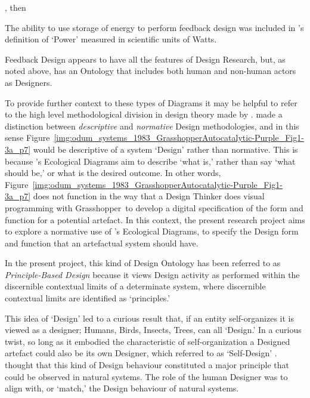 \documentclass[a4paper,12pt]{article}
\begin{document}
,  then 


\citet[p.~15]{odum_systems_1983}



The ability to use storage of energy to perform feedback design was included in \citeauthor{odum_systems_1983}'s definition of `Power' measured in scientific units of Watts. 

Feedback Design appears to have all the features of Design Research, but, as noted above, has an Ontology that includes both human and non-human actors as Designers. 

To provide further context to these types of Diagrams it may be helpful to refer to the high level methodological division in design theory made by \citet{behdad_synergy_2013}. \citeauthor{behdad_synergy_2013} made a  distinction between \textit{descriptive} and \textit{normative} Design methodologies, and in this sense Figure~\ref{img:odum_systems_1983_GrasshopperAutocatalytic-Purple_Fig1-3a_p7} would be descriptive of a system `Design' rather than normative. This is because \citeauthor{odum_systems_1983}'s Ecological Diagrams aim to describe `what is,' rather than say `what should be,' or what is the desired outcome. In other words, Figure~\ref{img:odum_systems_1983_GrasshopperAutocatalytic-Purple_Fig1-3a_p7} does not function in the way that a Design Thinker does visual programming with Grasshopper\texttrademark\ to develop a digital specification of the form and function for a potential artefact. In this context, the present research project aims to explore a normative use of \citeauthor{odum_systems_1983}'s Ecological Diagrams, to specify the Design form and function that an artefactual system should have. 


In the present project, this kind of Design Ontology has been referred to as \textit{Principle-Based Design} because it views Design activity as performed within the discernible contextual limits of a determinate system, where discernible contextual limits are identified as `principles.' 




This idea of `Design' led to a curious result that, if an entity self-organizes it is viewed as a designer; Humans, Birds, Insects, Trees, can all `Design.' In a curious twist, so long as it embodied the characteristic of self-organization a Designed artefact could also be its own Designer, which \citeauthor{odum_systems_1983} referred to as `Self-Design' \citep[pp.~6,451]{odum_systems_1983}. \citeauthor{odum_systems_1983} thought that this kind of Design behaviour constituted a major principle that could be observed in natural systems. The role of the human Designer was to align with, or `match,' the Design behaviour of natural systems.
\end{document}
